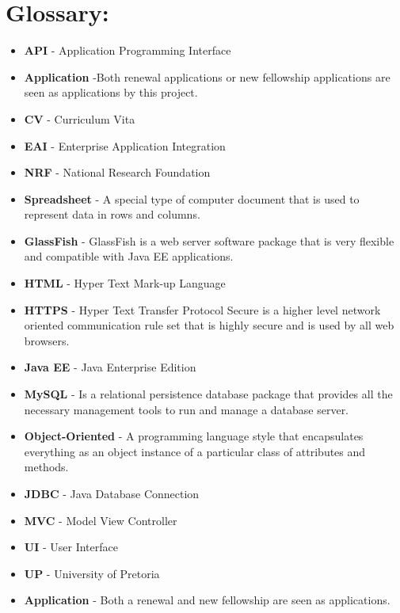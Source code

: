 \documentclass[12pt]{article}
\begin{document}
\newpage


\newpage
\section{Glossary:}
\vspace{0.2in}

\begin{itemize}

\item \textbf{API} - Application Programming Interface
\item \textbf{Application} -Both renewal applications or new fellowship applications are seen as applications by this project.
\item \textbf{CV} - Curriculum Vita
\item \textbf{EAI} - Enterprise Application Integration
\item \textbf{NRF} - National Research Foundation
\item \textbf{Spreadsheet} - A special type of computer document that is used to represent data in rows and columns.
\item \textbf{GlassFish} - GlassFish is a web server software package that is very flexible and compatible with Java EE applications. 
\item \textbf{HTML} - Hyper Text Mark-up Language
\item \textbf{HTTPS} - Hyper Text Transfer Protocol Secure is a higher level network oriented communication rule set that is highly secure and is used by all web browsers. 
\item \textbf{Java EE} - Java Enterprise Edition
\item \textbf{MySQL} - Is a relational persistence database package that provides all the necessary management tools to run and manage a database server.
\item \textbf{Object-Oriented} - A programming language style that encapsulates everything as an object instance of a particular class of attributes and methods.
\item \textbf{JDBC} - Java Database Connection
\item \textbf{MVC} - Model View Controller
\item \textbf{UI} - User Interface
\item \textbf{UP} - University of Pretoria
\item \textbf{Application} - Both a renewal and new fellowship are seen as applications.

\end{itemize}	


\vspace{0.5in}
\end{document}
